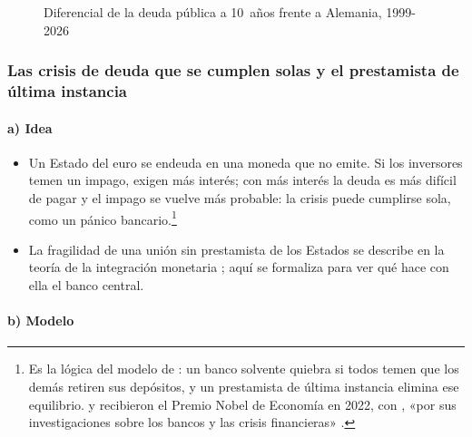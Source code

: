 \documentclass[11pt]{article}
\begin{document}
\begin{figure}[H]
\centering
\caption{Diferencial de la deuda pública a 10~años frente a Alemania, 1999-2026}\label{fig:diferenciales}
\end{figure}

\subsubsection{Las crisis de deuda que se cumplen solas y el prestamista de última instancia}\label{sec:autocumplida}

\paragraph{a) Idea}

\begin{itemize}
\item Un Estado del euro se endeuda en una moneda que no emite. Si los inversores temen un impago, exigen más interés; con más interés la deuda es más difícil de pagar y el impago se vuelve más probable: la crisis puede cumplirse sola, como un pánico bancario\nocite{Calvo1988Servicing,DeGrauwe2011Governance}.\footnote{Es la lógica del modelo de \textcite{DiamondDybvig1983}: un banco solvente quiebra si todos temen que los demás retiren sus depósitos, y un prestamista de última instancia elimina ese equilibrio.  y  recibieron el Premio Nobel de Economía en 2022, con , «por sus investigaciones sobre los bancos y las crisis financieras»\nocite{Nobel2022Bancos} .}
\item La fragilidad de una unión sin prestamista de los Estados se describe en la teoría de la integración monetaria ; aquí se formaliza para ver qué hace con ella el banco central.
\end{itemize}

\paragraph{b) Modelo}
\end{document}

